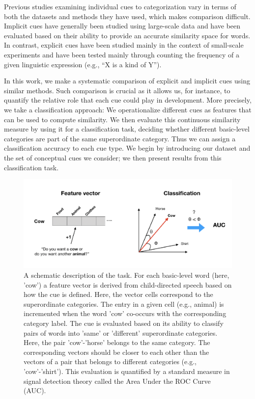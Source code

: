 \documentclass[english,,man,floatsintext]{apa6}
\begin{document}
Previous studies examining individual cues to categorization vary in terms of both the datasets and methods they have used, which makes comparison difficult. Implicit cues have
generally been studied using large-scale data and have been evaluated based on their ability to provide an accurate similarity space for words. In contrast, explicit cues have been studied mainly in the context of small-scale experiments and have been tested mainly through counting the frequency of a given linguistic expression (e.g., \enquote{X is a
kind of Y}).

In this work, we make a systematic comparison of explicit and implicit cues using similar methods. Such comparison is crucial as it allows us, for instance, to quantify the relative role that each cue could play in development. More precisely, we take a classification approach: We operationalize different cues as features that can be used to compute similarity. We then evaluate this continuous similarity measure by using it for a classification task, deciding whether different basic-level
categories are part of the same superordinate category. Thus we can assign a classification accuracy to each cue type. We begin by introducing our dataset and the set of conceptual cues we consider; we then present results from this classification task.

\begin{figure}[h]

{\centering \includegraphics{cogsci_journal_files/figure-latex/task-1} 

}

\caption{\label{fig:task} A schematic description of the task. For each basic-level word (here, 'cow') a feature vector is derived from child-directed speech based on how the cue is defined. Here, the vector cells correspond to the superordinate categories. The entry in a given cell (e.g., animal) is incremented when the word 'cow' co-occurs with the corresponding category label. The cue is evaluated based on its ability to classify pairs of words into 'same' or 'different' superordinate categories. Here, the pair 'cow'-'horse' belongs to the same category. The corresponding vectors should be closer to each other than the vectors of a pair that belongs to different categories (e.g., 'cow'-'shirt'). This evaluation is quantified by a standard measure in signal detection theory called the Area Under the ROC Curve (AUC).}\label{fig:task}
\end{figure}
\end{document}
